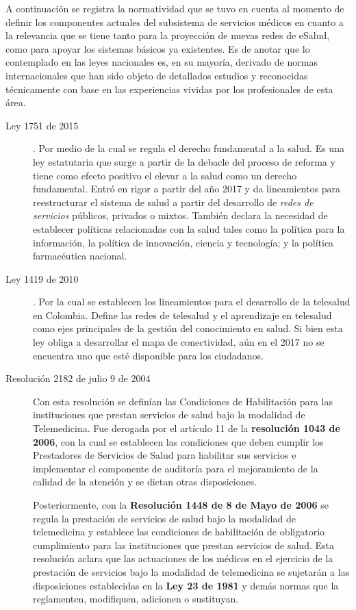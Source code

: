 A continuación se registra la normatividad que se tuvo en cuenta al momento de definir los componentes actuales del subsistema de servicios médicos en cuanto a la relevancia que se tiene tanto para la proyección de nuevas redes de eSalud, como para apoyar los sistemas básicos ya existentes. Es de anotar que lo contemplado en las leyes nacionales es, en su mayoría, derivado de normas internacionales que han sido objeto de detallados estudios y reconocidas técnicamente con base en las experiencias vividas por los profesionales de esta área. 

\begin{description}

\item[Ley 1751 de 2015]. Por medio de la cual se regula el derecho fundamental a la salud. Es una ley estatutaria que surge a partir de la debacle del proceso de reforma y tiene como efecto positivo el elevar a la salud como un derecho fundamental. Entró en rigor a partir del año 2017 y da lineamientos para reestructurar el sistema de salud a partir del desarrollo de \textit{redes de servicios} públicos, privados o mixtos. También declara la necesidad de establecer políticas relacionadas con la salud tales como la política para la información, la política de innovación, ciencia y tecnología; y la política farmacéutica nacional.

\item[Ley 1419 de 2010].  Por la cual se establecen los lineamientos para el desarrollo de la telesalud en Colombia. Define las redes de telesalud y el aprendizaje en telesalud como ejes principales de la gestión del conocimiento en salud. Si bien esta ley obliga a desarrollar el mapa de conectividad, aún en el 2017 no se encuentra uno que esté disponible para los ciudadanos.

\item[Resolución 2182 de julio 9 de 2004] Con esta resolución se definían las Condiciones de Habilitación para las instituciones que prestan servicios de salud bajo la modalidad de Telemedicina. Fue derogada por el artículo 11 de la \textbf{resolución 1043 de 2006}, con la cual se establecen las condiciones que deben cumplir los Prestadores de Servicios de Salud para habilitar sus servicios e implementar el componente de auditoría para el mejoramiento de la calidad de la atención y se dictan otras disposiciones. 

Posteriormente, con la \textbf{Resolución 1448 de 8 de Mayo de 2006} se regula la prestación de servicios de salud bajo la modalidad de telemedicina y establece las condiciones de habilitación de obligatorio cumplimiento para las instituciones que prestan servicios de salud. Esta resolución aclara que las actuaciones de los médicos en el ejercicio de la prestación de servicios bajo la modalidad de telemedicina se sujetarán a las disposiciones establecidas en la \textbf{Ley 23 de 1981} y demás normas que la reglamenten, modifiquen, adicionen o sustituyan.


\end{description}

